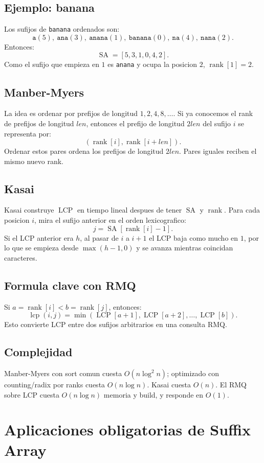 \documentclass[10pt]{article}
\newcommand{\bigO}{O}
\newcommand{\SA}{\operatorname{SA}}
\newcommand{\LCP}{\operatorname{LCP}}
\newcommand{\rankv}{\operatorname{rank}}
\begin{document}
\subsection{Ejemplo: banana}
Los sufijos de \texttt{banana} ordenados son:
\[
\texttt{a}(5),\ \texttt{ana}(3),\ \texttt{anana}(1),\ \texttt{banana}(0),\ \texttt{na}(4),\ \texttt{nana}(2).
\]
Entonces:
\[
\SA=[5,3,1,0,4,2].
\]
Como el sufijo que empieza en \(1\) es \texttt{anana} y ocupa la posicion \(2\), \(\rankv[1]=2\).

\subsection{Manber-Myers}
La idea es ordenar por prefijos de longitud \(1,2,4,8,\ldots\). Si ya conocemos el rank de prefijos de longitud
\(len\), entonces el prefijo de longitud \(2len\) del sufijo \(i\) se representa por:
\[
(\rankv[i],\rankv[i+len]).
\]
Ordenar estos pares ordena los prefijos de longitud \(2len\). Pares iguales reciben el mismo nuevo rank.

\subsection{Kasai}
Kasai construye \(\LCP\) en tiempo lineal despues de tener \(\SA\) y \(\rankv\). Para cada posicion \(i\), mira
el sufijo anterior en el orden lexicografico:
\[
j=\SA[\rankv[i]-1].
\]
Si el LCP anterior era \(h\), al pasar de \(i\) a \(i+1\) el LCP baja como mucho en \(1\), por lo que se empieza
desde \(\max(h-1,0)\) y se avanza mientras coincidan caracteres.

\subsection{Formula clave con RMQ}
Si \(a=\rankv[i]<b=\rankv[j]\), entonces:
\[
\operatorname{lcp}(i,j)=\min(\LCP[a+1],\LCP[a+2],\ldots,\LCP[b]).
\]
Esto convierte LCP entre dos sufijos arbitrarios en una consulta RMQ.

\subsection{Complejidad}
Manber-Myers con sort comun cuesta \(\bigO(n\log^2 n)\); optimizado con counting/radix por ranks cuesta
\(\bigO(n\log n)\). Kasai cuesta \(\bigO(n)\). El RMQ sobre LCP cuesta \(\bigO(n\log n)\) memoria y build,
y responde en \(\bigO(1)\).

\section{Aplicaciones obligatorias de Suffix Array}
\end{document}
